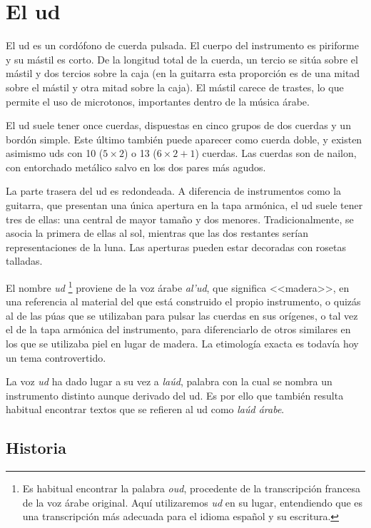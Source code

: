 \chapter{El ud}

El ud es un cordófono de cuerda pulsada. El cuerpo del instrumento es piriforme y su mástil es corto. De la longitud total de la cuerda, un tercio se sitúa sobre el mástil y dos tercios sobre la caja (en la guitarra esta proporción es de una mitad sobre el mástil y otra mitad sobre la caja). El mástil carece de trastes, lo que permite el uso de microtonos, importantes dentro de la música árabe.

El ud suele tener once cuerdas, dispuestas en cinco grupos de dos cuerdas y un bordón simple. Este último también puede aparecer como cuerda doble, y existen asimismo uds con 10 ($5\times2$) o 13 ($6\times2+1$) cuerdas. Las cuerdas son de nailon, con entorchado metálico salvo en los dos pares más agudos.

La parte trasera del ud es redondeada. A diferencia de instrumentos como la guitarra, que presentan una única apertura en la tapa armónica, el ud suele tener tres de ellas: una central de mayor tamaño y dos menores. Tradicionalmente, se asocia la primera de ellas al sol, mientras que las dos restantes serían representaciones de la luna. Las aperturas pueden estar decoradas con rosetas talladas.

El nombre \emph{ud} \footnote{Es habitual encontrar la palabra \emph{oud}, procedente de la transcripción francesa de la voz árabe original. Aquí utilizaremos \emph{ud} en su lugar, entendiendo que es una transcripción más adecuada para el idioma español y su escritura.} proviene de la voz árabe \emph{al'ud}, que significa <<madera>>, en una referencia al material del que está construido el propio instrumento, o quizás al de las púas que se utilizaban para pulsar las cuerdas en sus orígenes, o tal vez el de la tapa armónica del instrumento, para diferenciarlo de otros similares en los que se utilizaba piel en lugar de madera. La etimología exacta es todavía hoy un tema controvertido.

La voz \emph{ud} ha dado lugar a su vez a \emph{laúd}, palabra con la cual se nombra un instrumento distinto aunque derivado del ud. Es por ello que también resulta habitual encontrar textos que se refieren al ud como \emph{laúd árabe}.

\section{Historia}

